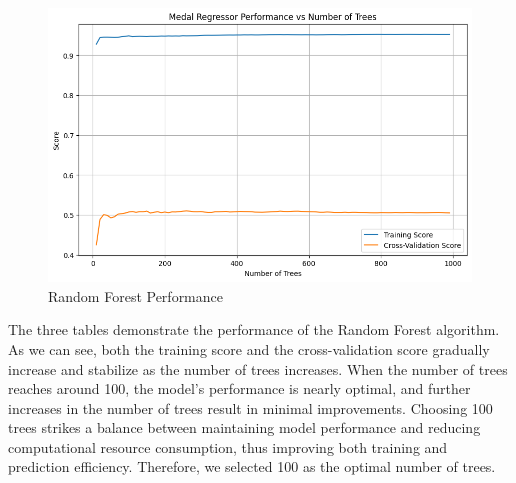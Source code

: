 \documentclass[12pt]{article}
\begin{document}
\begin{figure}[h]
    \begin{minipage}[b]{0.33\textwidth}
		\centering
		\includegraphics[width=1\textwidth]{figure/random_forest_total_meadl.png}
	\end{minipage}
	\caption{Random Forest Performance}
\end{figure}

The three tables demonstrate the performance of the Random Forest algorithm. As we can see, both the training score and the cross-validation score gradually increase and stabilize as the number of trees increases. When the number of trees reaches around 100, the model's performance is nearly optimal, and further increases in the number of trees result in minimal improvements. Choosing 100 trees strikes a balance between maintaining model performance and reducing computational resource consumption, thus improving both training and prediction efficiency. Therefore, we selected 100 as the optimal number of trees.
\end{document}
